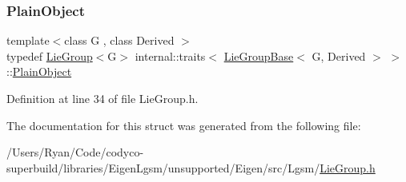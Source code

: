 \subsubsection{\texorpdfstring{Plain\+Object}{PlainObject}}
{\footnotesize\ttfamily template$<$class G , class Derived $>$ \\
typedef \hyperlink{class_lie_group}{Lie\+Group}$<$G$>$ internal\+::traits$<$ \hyperlink{class_lie_group_base}{Lie\+Group\+Base}$<$ G, Derived $>$ $>$\+::\hyperlink{structinternal_1_1traits_3_01_lie_group_base_3_01_g_00_01_derived_01_4_01_4_ab084d160b54f79b7e1b9a594abd31e5f}{Plain\+Object}}



Definition at line 34 of file Lie\+Group.\+h.



The documentation for this struct was generated from the following file\+:\begin{DoxyCompactItemize}
\item 
/\+Users/\+Ryan/\+Code/codyco-\/superbuild/libraries/\+Eigen\+Lgsm/unsupported/\+Eigen/src/\+Lgsm/\hyperlink{_lie_group_8h}{Lie\+Group.\+h}\end{DoxyCompactItemize}
